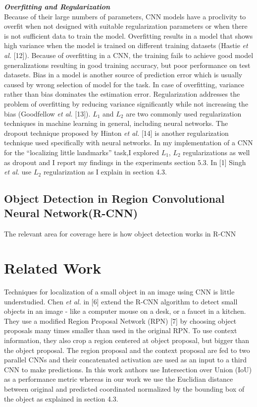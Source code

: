 \documentclass [11pt,letterpaper ,twoside ,openany ]{report}
\begin{document}
    \noindent
    \textbf{\textit{Overfitting and Regularization}}\\    
    Because of their large numbers of parameters, CNN models have a proclivity to overfit when not designed with suitable regularization parameters or when there is not sufficient data to train the model. Overfitting results in a model that shows high variance when the model is trained on different training datasets (Hastie \textit {et al.} [12]). Because of overfitting in a CNN, the training fails to achieve good model generalizations resulting in good training accuracy, but poor performance on test datasets. Bias in a model is another source of prediction error which is usually caused by wrong selection of model for the task. In case of overfitting, variance rather than bias dominates the estimation error. Regularization addresses the problem of overfitting by reducing variance significantly while not increasing the bias (Goodfellow \textit {et al.} [13]). \(L_1\) and \(L_2\) are two commonly used regularization techniques in machine learning in general, including neural networks. The dropout technique proposed by Hinton \textit {et al.} [14] is another regularization technique used specifically with neural networks. In my implementation of a CNN for the ``localizing little landmarks'' task,I explored \(L_1\), \(L_2\) regularizations as well as dropout and I report my findings in the experiments section 5.3. In [1] Singh \textit{et al.} use \(L_2\) regularization as I explain in section 4.3.

     \section{Object Detection in Region Convolutional Neural Network(R-CNN)}
     The relevant area for coverage here is how object detection works in R-CNN

    \chapter{Related Work}
    \doublespacing
    Techniques for localization of a small object in an image using CNN is little understudied. Chen \textit{et al.} in [6] extend the R-CNN algorithm to detect small objects in an image - like a computer mouse on a desk, or a faucet in a kitchen. They use a modified Region Proposal Network (RPN) [7] by choosing object proposals many times smaller than used in the original RPN. To use context information, they also crop a region centered at object proposal, but bigger than the object proposal. The region proposal and the context proposal are fed to two parallel CNNs and their concatenated activation are used as an input to a third CNN to make predictions. In this work authors use Intersection over Union (IoU) as a performance metric whereas in our work we use the Euclidian distance between original and predicted coordinated normalized by the bounding box of the object as explained in section 4.3. 
\end{document}
